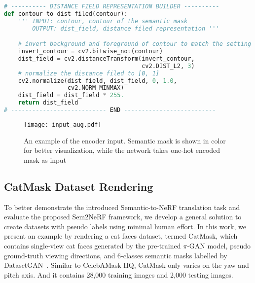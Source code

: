 \documentclass[runningheads]{llncs}
\begin{document}
\begin{lstlisting}[language=Python]
# ---------- DISTANCE FIELD REPRESENTATION BUILDER ----------
def contour_to_dist_filed(contour):
    ''' INPUT: contour, contour of the semantic mask
        OUTPUT: dist_field, distance filed representation '''

    # invert background and foreground of contour to match the setting
    invert_contour = cv2.bitwise_not(contour)
    dist_field = cv2.distanceTransform(invert_contour, 
                                       cv2.DIST_L2, 3)
    # normalize the distance filed to [0, 1]
    cv2.normalize(dist_field, dist_field, 0, 1.0, 
                  cv2.NORM_MINMAX)
    dist_field = dist_field * 255.
    return dist_field
# --------------------------- END --------------------------
\end{lstlisting}


\begin{figure}[t!]
    \centering
    \texttt{[image: input\_aug.pdf]}
\caption{An example of the encoder input. Semantic mask is shown in color for better visualization, while the network takes one-hot encoded mask as input}
\label{fig:input_aug}
\end{figure}



\subsection{CatMask Dataset Rendering} \label{sec:tech_cat}

To better demonstrate the introduced Semantic-to-NeRF translation task and evaluate the proposed Sem2NeRF framework, we develop a general solution to create datasets with pseudo labels using minimal human effort. In this work, we present an example by rendering a cat faces dataset, termed CatMask, which contains single-view cat faces generated by the pre-trained $\pi$-GAN model, pseudo ground-truth viewing directions, and 6-classes semantic masks labelled by DatasetGAN~\cite{zhang2021datasetgan}. 
Similar to CelebAMask-HQ, CatMask only varies on the yaw and pitch axis. And it contains 28,000 training images and 2,000 testing images.
\end{document}
